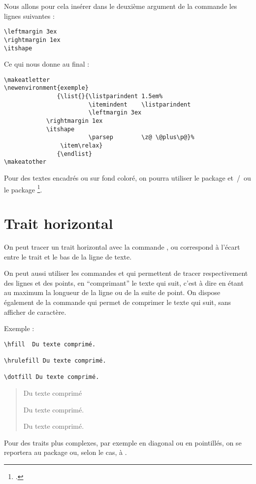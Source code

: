 Nous allons pour cela insérer dans le deuxième argument de la commande  les lignes suivantes :
\begin{verbatim}
\leftmargin 3ex
\rightmargin 1ex
\itshape
\end{verbatim}

Ce qui nous donne au final :

\begin{verbatim}
\makeatletter
\newenvironment{exemple}
               {\list{}{\listparindent 1.5em%
                        \itemindent    \listparindent
                        \leftmargin 3ex
		    \rightmargin 1ex
		    \itshape
                        \parsep        \z@ \@plus\p@}%
                \item\relax}
               {\endlist}
\makeatother
\end{verbatim}

\begin{plusloins}
Pour des textes encadrés ou sur fond coloré, on pourra utiliser le package  et~/~ou le package \footcites[On peut également consulter][qui regorge d'exemple pratique de \enquote{mise en boîte}]{frama}[on consultera en particulier][]{frama_boites}. 
\end{plusloins}

\section{Trait horizontal}\label{filets}

On peut tracer un trait horizontal avec la commande , ou  correspond à l'écart entre le trait et le bas de la ligne de texte.

On peut aussi utiliser les commandes  et  qui permettent de tracer respectivement des lignes et des points, en \enquote{comprimant} le texte qui suit, c'est à dire en étant au maximum la longueur de la ligne ou de la suite de point. On dispose également de la commande \label{hfill} qui permet de comprimer le texte qui suit, sans afficher de caractère.

Exemple :
\begin{verbatim}
\hfill	Du texte comprimé.

\hrulefill Du texte comprimé.

\dotfill Du texte comprimé.
\end{verbatim}

\begin{quotation}
\hfill Du texte comprimé

\hrulefill Du texte comprimé.

\dotfill Du texte comprimé.
\end{quotation}

Pour des traits plus complexes, par exemple en diagonal ou en pointillés, on se reportera au package  ou, selon le cas, à . 



